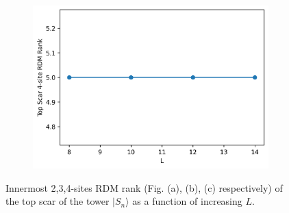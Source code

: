 \documentclass[11pt]{article}
\begin{document}
\begin{itemize}
\begin{itemize}
\begin{figure}[H]
\begin{subfigure}{0.45\textwidth}
        \includegraphics[width=\linewidth]{xy_scar_4.png}
        \caption{}
        \label{fig:image3xy}
    \end{subfigure}

    \caption{Innermost 2,3,4-sites RDM  rank (Fig. (a), (b), (c) respectively) of the top scar of the tower $|S_n\rangle$ as a function of increasing $L$.}
    \label{fig:xy_scars_tower}
\end{figure}


\end{itemize}
\end{itemize}
\end{document}
